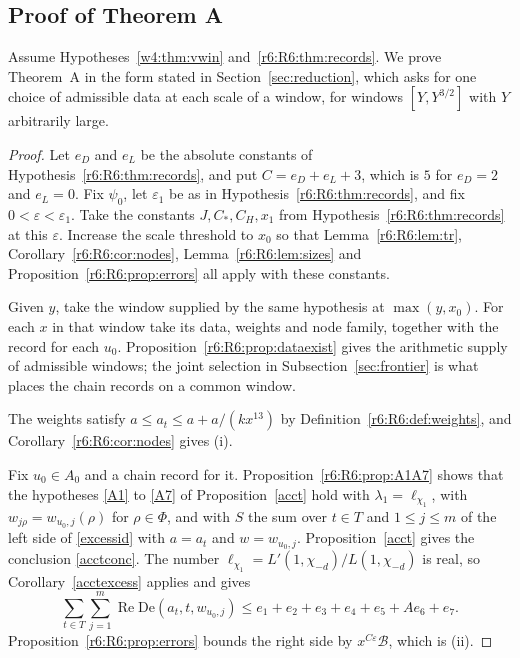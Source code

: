 \subsection{Proof of Theorem A}\label{r6:R6:sec:thmA}

Assume Hypotheses~\ref{w4:thm:vwin} and~\ref{r6:R6:thm:records}. We prove Theorem~A in the form stated in Section~\ref{sec:reduction}, which asks for one choice of admissible data at each scale of a window, for windows $[Y,Y^{3/2}]$ with $Y$ arbitrarily large.

\begin{proof}
Let $e_D$ and $e_L$ be the absolute constants of Hypothesis~\ref{r6:R6:thm:records}, and put $C=e_D+e_L+3$, which is $5$ for $e_D=2$ and $e_L=0$. Fix $\psi_0$, let $\varepsilon_1$ be as in Hypothesis~\ref{r6:R6:thm:records}, and fix $0<\varepsilon<\varepsilon_1$. Take the constants $J,C_\ast,C_H,x_1$ from Hypothesis~\ref{r6:R6:thm:records} at this $\varepsilon$. Increase the scale threshold to $x_0$ so that Lemma~\ref{r6:R6:lem:tr}, Corollary~\ref{r6:R6:cor:nodes}, Lemma~\ref{r6:R6:lem:sizes} and Proposition~\ref{r6:R6:prop:errors} all apply with these constants.

Given $y$, take the window supplied by the same hypothesis at $\max(y,x_0)$. For each $x$ in that window take its data, weights and node family, together with the record for each $u_0$. Proposition~\ref{r6:R6:prop:dataexist} gives the arithmetic supply of admissible windows; the joint selection in Subsection~\ref{sec:frontier} is what places the chain records on a common window.

The weights satisfy $a\le a_t\le a+a/(kx^{13})$ by Definition~\ref{r6:R6:def:weights}, and Corollary~\ref{r6:R6:cor:nodes} gives (i).

Fix $u_0\in A_0$ and a chain record for it. Proposition~\ref{r6:R6:prop:A1A7} shows that the hypotheses \eqref{A1} to \eqref{A7} of Proposition~\ref{acct} hold with $\lambda_1=\ell_{\chi_1}$, with $w_{j\rho}=w_{u_0,j}(\rho)$ for $\rho\in\Phi$, and with $S$ the sum over $t\in T$ and $1\le j\le m$ of the left side of \eqref{excessid} with $a=a_t$ and $w=w_{u_0,j}$. Proposition~\ref{acct} gives the conclusion \eqref{acctconc}. The number $\ell_{\chi_1}=L'(1,\chi_{-d})/L(1,\chi_{-d})$ is real, so Corollary~\ref{acctexcess} applies and gives
\[
\sum_{t\in T}\sum_{j=1}^m\operatorname{Re}\mathrm{De}(a_t,t,w_{u_0,j})\le e_1+e_2+e_3+e_4+e_5+Ae_6+e_7 .
\]
Proposition~\ref{r6:R6:prop:errors} bounds the right side by $x^{C\varepsilon}\mathcal B$, which is (ii).
\end{proof}

